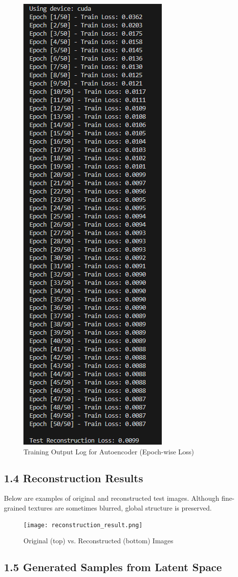 \documentclass[12pt]{article}
\begin{document}
\begin{figure}[H]
    \centering
    \includegraphics[width=0.35\linewidth]{question1_test_scores.png}
    \caption{Training Output Log for Autoencoder (Epoch-wise Loss)}
\end{figure}

\subsection*{1.4 Reconstruction Results}

Below are examples of original and reconstructed test images. Although fine-grained textures are sometimes blurred, global structure is preserved.

\begin{figure}[H]
    \centering
    \texttt{[image: reconstruction\_result.png]}
    \caption{Original (top) vs. Reconstructed (bottom) Images}
\end{figure}

\subsection*{1.5 Generated Samples from Latent Space}
\end{document}
